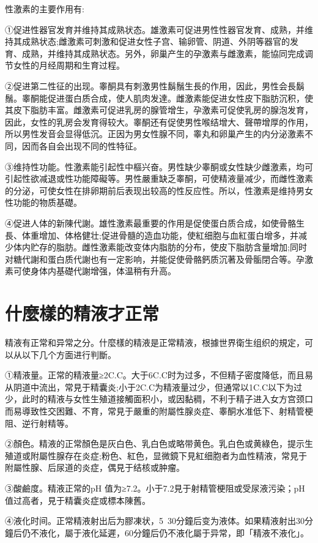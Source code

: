 \documentclass[12pt,UTF8]{ctexbook}
\begin{document}
性激素的主要作用有:

①促进性器官发育并维持其成熟状态。雄激素可促进男性性器官发育、成熟，并维持其成熟状态;雌激素可刺激和促进女性子宫、输卵管、阴道、外阴等器官的发育、成熟，并维持其成熟状态。另外，卵巢产生的孕激素与雌激素，能協同完成调节女性的月经周期和生育过程。

②促进第二性征的出现。睾酮具有刺激男性鬍鬚生長的作用，因此，男性会長鬍鬚。睾酮能促进蛋白质合成，使人肌肉发達。雌激素能促进女性皮下脂肪沉积，使其皮下脂肪丰富。雌激素可促进乳房的腺管增生，孕激素可促使乳房的腺泡发育，因此，女性的乳房会发育得较大。睾酮还有促使男性喉结增大、聲帶增厚的作用，所以男性发音会显得低沉。正因为男女性腺不同，睾丸和卵巢产生的内分泌激素不同，因而各自会出现不同的性特征。

③维持性功能。性激素能引起性中樞兴奋。男性缺少睾酮或女性缺少雌激素，均可引起性欲减退或性功能障礙等。男性嚴重缺乏睾酮，可使精液量减少，而雌性激素的分泌，可使女性在排卵期前后表现出较高的性反应性。所以，性激素是维持男女性功能的物质基礎。

④促进人体的新陳代謝。雄性激素最重要的作用是促使蛋白质合成，如使骨骼生長、体重增加、体格健壮;促进骨髓的造血功能，使紅细胞与血紅蛋白增多，并减少体内贮存的脂肪。雌性激素能改变体内脂肪的分布，使皮下脂肪含量增加;同时对糖代謝和蛋白质代謝也有一定影响，并能促使骨骼鈣质沉著及骨骺閉合等。孕激素可使身体内基礎代謝增强，体温稍有升高。

\section{什麼樣的精液才正常}

精液有正常和异常之分。什麼樣的精液是正常精液，根據世界衛生组织的規定，可以从以下几个方面进行判斷。

①精液量。正常的精液量≥2C.C。大于6C.C时为过多，不但精子密度降低，而且易从阴道中流出，常見于精囊炎;小于2C.C为精液量过少，但通常以1C.C以下为过少，此时的精液与女性生殖道接觸面积小，或因黏稠，不利于精子进入女方宫颈口而易導致性交困難、不育，常見于嚴重的附屬性腺炎症、睾酮水准低下、射精管梗阻、逆行射精等。

②顏色。精液的正常顏色是灰白色、乳白色或略带黄色。乳白色或黄綠色，提示生殖道或附屬性腺存在炎症;粉色、紅色，显微鏡下見紅细胞者为血性精液，常見于附屬性腺、后尿道的炎症，偶見于结核或肿瘤。

③酸鹼度。精液正常的pH 值为≥7.2。小于7.2見于射精管梗阻或受尿液污染；pH值过高者，見于精囊炎症或標本陳舊。

④液化时间。正常精液射出后为膠凍状，5~30分鐘后变为液体。如果精液射出30分鐘后仍不液化，屬于液化延遲，60分鐘后仍不液化屬于异常，即「精液不液化」。
\end{document}
